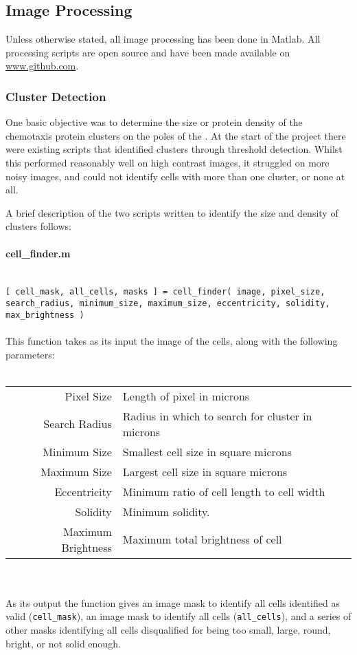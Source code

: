 \documentclass[../main.tex]{subfiles}
\begin{document}
\subsection{Image Processing}
Unless otherwise stated, all image processing has been done in Matlab. All processing scripts are open source and have been made available on \url{www.github.com}.

\subsubsection{Cluster Detection}
One basic objective was to determine the size or protein density of the chemotaxis protein clusters on the poles of the \ecoli. At the start of the project there were existing scripts that identified clusters through threshold detection. Whilst this performed reasonably well on high contrast images, it struggled on more noisy images, and could not identify cells with more than one cluster, or none at all.

A brief description of the two scripts written to identify the size and density of clusters follows:

\paragraph{cell\_finder.m}\ \\
\texttt{[ cell\_mask, all\_cells, masks ] = cell\_finder( image, pixel\_size, search\_radius, minimum\_size, maximum\_size, eccentricity, solidity, max\_brightness ) }
\\\\
This function takes as its input the image of the cells, along with the following parameters:
\\\\
\begin{tabular}{rl}
Pixel Size		&	Length of pixel in microns\\
Search Radius 	&	Radius in which to search for cluster in microns\\
Minimum Size		&	Smallest cell size in square microns\\
Maximum Size		&	Largest cell size in square microns\\
Eccentricity		&	Minimum ratio of cell length to cell width\\
Solidity			&	Minimum solidity\myfootnotemark.\\
Maximum Brightness	&	Maximum total brightness of cell
\end{tabular}
\\\\
As its output the function gives an image mask to identify all cells identified as valid (\texttt{cell\_mask}), an image mask to identify all cells (\texttt{all\_cells}), and a series of other masks identifying all cells disqualified for being too small, large, round, bright, or not solid enough.
\end{document}
